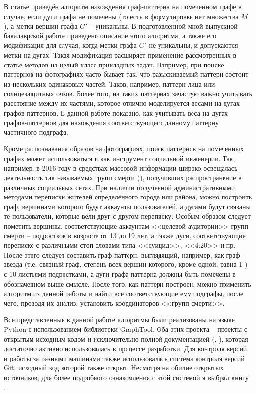 В статье \cite{patmat} приведён алгоритм нахождения граф-паттерна на помеченном графе в случае, если дуги графа не помечены (то есть в формулировке нет множества $M$), а метки вершин графа $G'$ -- уникальны. В подготовленной мной выпускной бакалаврской работе приведено описание этого алгоритма, а также его модификация для случая, когда метки графа $G'$ не уникальны, и допускаются метки на дугах. Такая модификация расширяет применение рассмотренных в статье \cite{patmat} методов на целый класс прикладных задач. Например, при поиске паттернов на фотографиях часто бывает так, что разыскиваемый паттерн состоит из нескольких одинаковых частей. Таков, например, паттерн лица или солнцезащитных очков. Более того, на таких паттернах зачастую важно учитывать расстояние между их частями, которое отлично моделируется весами на дугах графов-паттернов. В данной работе показано, как учитывать веса на дугах графов-паттернов для нахождения соответствующего данному паттерну частичного подграфа.

Кроме распознавания образов на фотографиях, поиск паттернов на помеченных графах может использоваться и как инструмент социальной инженерии. Так, например, в 2016 году в средствах массовой информации широко освещалась деятельность так называемых групп смерти (\cite{sinkit}), получивших распространение в различных социальных сетях. При наличии полученной административными методами переписки жителей определённого города или района, можно построить граф, вершинами которого будут аккаунты пользователей, а дугами будут связаны те пользователи, которые вели друг с другом переписку. Особым образом следует пометить вершины, соответствующие аккаунтам <<целевой аудитории>> групп смерти -- подростков в возрасте от 13 до 19 лет, а также дуги, соответствующие переписке с различными стоп-словами типа <<суицид>>, <<4:20>> и пр. После этого следует составить граф-паттерн, выглядящий, например, как граф-звезда (т.е. связный граф, степень всех вершин которого, кроме одной, равна 1 \cite{stargraph}) с 10 листьями-подростками, а дуги графа-паттерна должны быть помечены в обозначенном выше смысле. После того, как паттерн построен, можно применить алгоритм из данной работы и найти все соответствующие ему подграфы, после чего, проводя их анализ, установить координаторов <<групп смерти>>.

Все представленные в данной работе алгоритмы были реализованы на языке Python с использованием библиотеки GraphTool. Оба этих проекта -- проекты с открытым исходным кодом и исключительно полной документацией (\cite{pythdoc}, \cite{graphtool}), которая достаточно активно использовалась в процессе разработки. Для контроля версий и работы за разными машинами также использовалась система контроля версий Git, исходный код которой также открыт. Несмотря на обилие открытых источников, для более подробного ознакомления с этой системой я выбрал книгу \cite{gitbook}.